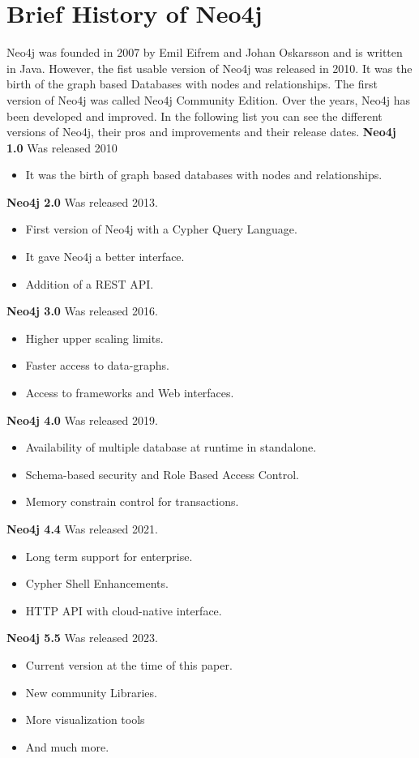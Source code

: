 
\section{Brief History of Neo4j} \label{sec:history}
Neo4j was founded in 2007 by Emil Eifrem and Johan Oskarsson and is written in Java.
However, the fist usable version of Neo4j was released in 2010.
It was the birth of the graph based Databases with nodes and relationships.
The first version of Neo4j was called Neo4j Community Edition.
Over the years, Neo4j has been developed and improved.
In the following list you can see the different versions of Neo4j, their pros and improvements and their release dates.
\textbf{Neo4j 1.0} Was released 2010
\begin{itemize}
    \item It was the birth of graph based databases with nodes and relationships.
\end{itemize}
\textbf{Neo4j 2.0} Was released 2013.
\begin{itemize}
    \item First version of Neo4j with a Cypher Query Language.
    \item It gave Neo4j a better interface.
    \item Addition of a REST API.
\end{itemize}
\textbf{Neo4j 3.0} Was released 2016.
\begin{itemize}
    \item Higher upper scaling limits.
    \item Faster access to data-graphs.
    \item Access to frameworks and Web interfaces.
\end{itemize}
\textbf{Neo4j 4.0} Was released 2019.
\begin{itemize}
    \item Availability of multiple database at runtime in standalone.
    \item Schema-based security and Role Based Access Control.
    \item Memory constrain control for transactions.
\end{itemize}
\textbf{Neo4j 4.4} Was released 2021.
\begin{itemize}
    \item Long term support for enterprise.
    \item Cypher Shell Enhancements.
    \item HTTP API with cloud-native interface.
\end{itemize}
\textbf{Neo4j 5.5} Was released 2023.
\begin{itemize}
    \item Current version at the time of this paper.
    \item New community Libraries.
    \item More visualization tools
    \item And much more.
\end{itemize}
